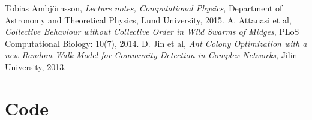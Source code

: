 \documentclass[a4paper,12pt]{article}
\theoremstyle{plain}
\theoremstyle{definition}
\begin{document}
      



\newpage

\begin{thebibliography}{99}
     Tobias Ambjörnsson,
     \emph{Lecture notes, Computational Physics},
     Department of Astronomy and Theoretical Physics,
     Lund University,
     2015.
      A. Attanasi et al,
      \emph{Collective Behaviour without Collective Order in Wild Swarms of
      Midges},
      PLoS Computational Biology: 10(7),
      2014.
      D. Jin et al,
      \emph{Ant Colony Optimization with a new Random Walk Model for Community
      Detection in Complex Networks},
      Jilin University,
      2013.
\end{thebibliography}
\newpage
\appendix
\section{Code}
\end{document}
